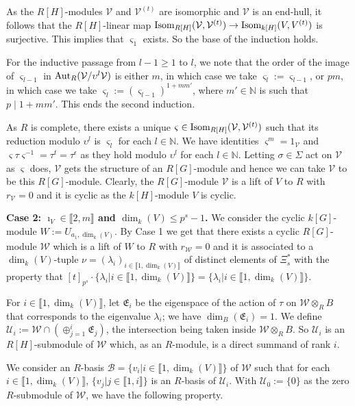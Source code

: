 \documentclass[11pt]{amsart}
\def\Aut{\textup{Aut}}
\def\Isom{\textup{Isom}}
\begin{document}
As the $R[H]$-modules $\mathcal V$ and $\mathcal V^{(t)}$ are isomorphic and $\mathcal V$ is an end-hull, it follows that the $R[H]$-linear map $\Isom_{R[H]}(\mathcal V,\mathcal V^{(t)})\rightarrow \Isom_{k[H]}(V,V^{(t)})$ is surjective. This implies that $\varsigma_1$ exists. So the base of the induction holds. 

For the inductive passage from $l-1\ge 1$ to $l$, we note that the order of the image of $\varsigma_{l-1}$ in $\Aut_R(\mathcal V/\upsilon^l\mathcal V)$ is either $m$, in which case we take $\varsigma_l:=\varsigma_{l-1}$, or $pm$, in which case we take $\varsigma_l:=(\varsigma_{l-1})^{1+mm'}$, where $m'\in\mathbb N$ is such that $p\mid 1+mm'$. This ends the second induction. 

As $R$ is complete, there exists a unique $\varsigma\in\Isom_{R[H]}(\mathcal V,\mathcal V^{(t)})$ such that its reduction modulo $\upsilon^l$ is $\varsigma_l$ for each $l\in\mathbb N$. We have identities $\varsigma^m=1_{\mathcal V}$ and $\varsigma\tau\varsigma^{-1}=\tau^t=\tau^{\epsilon}$ as they hold modulo $\upsilon^l$ for each $l\in\mathbb N$. Letting $\sigma\in\Sigma$ act on $\mathcal V$ as $\varsigma$ does, $\mathcal V$ gets the structure of an $R[G]$-module and hence we can take $\mathcal V$ to be this $R[G]$-module. Clearly, the $R[G]$-module $\mathcal V$ is a lift of $V$ to $R$ with $r_{\mathcal V}=0$ and it is cyclic as the $k[H]$-module $V$ is cyclic.

{\bf Case 2: $\imath_V\in\llbracket2,m\rrbracket$ and $\dim_k(V)\le p^s-1$.} We consider the cyclic $k[G]$-module $W:=U_{a_1,\dim_k(V)}$. By Case 1 we get that there exists a cyclic $R[G]$-module $\mathcal W$ which is a lift of $W$ to $R$ with $r_{\mathcal W}=0$ and it is associated to a $\dim_k(V)$-tuple $\nu=(\lambda_i)_{i\in\llbracket1,\dim_k(V)\rrbracket}$ of distinct elements of $\Xi_s^{\ast}$ with the property that $[t]_{p^s}\cdot\{\lambda_i|i\in\llbracket1,\dim_k(V)\rrbracket\}=\{\lambda_i|i\in\llbracket1,\dim_k(V)\rrbracket\}$. 

For $i\in\llbracket1,\dim_k(V)\rrbracket$, let $\mathfrak E_i$ be the eigenspace of the action of $\tau$ on $\mathcal W\otimes_R B$ that corresponds to the eigenvalue $\lambda_i$; we have $\dim_B(\mathfrak E_i)=1$. We define $\mathcal U_i:=\mathcal W\cap(\oplus_{j=1}^i \mathfrak E_j)$, the intersection being taken inside $\mathcal W\otimes_R B$. So $\mathcal U_i$ is an $R[H]$-submodule of $\mathcal W$ which, as an $R$-module, is a direct summand of rank $i$.

We consider an $R$-basis $\mathcal B=\{v_i|i\in\llbracket1,\dim_k(V)\rrbracket\}$ of $\mathcal W$ such that for each $i\in\llbracket1,\dim_k(V)\rrbracket$, $\{v_j|j\in\llbracket1,i\rrbracket\}$ is an $R$-basis of $\mathcal U_i$. With $\mathcal U_0:=\{0\}$ as the zero $R$-submodule of $\mathcal W$, we have the following property.
\end{document}
